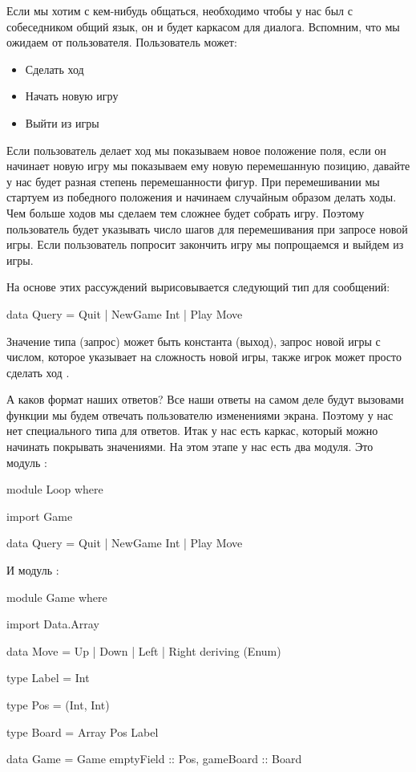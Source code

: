Если мы хотим с кем-нибудь общаться, необходимо чтобы
у нас был с собеседником общий язык, он и будет 
каркасом для диалога. Вспомним, что мы ожидаем
от пользователя. Пользователь может:

\begin{itemize}
\item Сделать ход 
\item Начать новую игру
\item Выйти из игры
\end{itemize}

Если пользователь делает ход мы показываем
новое положение поля, если он начинает новую игру
мы показываем ему новую перемешанную позицию, 
давайте у нас будет разная степень перемешанности фигур.
При перемешивании мы стартуем из победного положения и 
начинаем случайным образом делать ходы. Чем больше ходов
мы сделаем тем сложнее будет собрать игру. Поэтому
пользователь будет указывать число шагов для перемешивания
при запросе новой игры. Если пользователь попросит 
закончить игру мы попрощаемся и выйдем из игры. 

На основе этих рассуждений вырисовывается следующий
тип для сообщений:

\begin{code}
data Query = Quit | NewGame Int | Play Move
\end{code}

Значение типа  (запрос) может быть 
константа  (выход), запрос новой игры 
с числом, которое указывает на сложность новой игры, 
также игрок может просто сделать ход .

А каков формат наших ответов? Все наши ответы на самом деле
будут вызовами функции  мы будем отвечать пользователю
изменениями экрана. Поэтому у нас нет специального типа для ответов.
Итак у нас есть каркас, который можно начинать покрывать
значениями. На этом этапе у нас есть два модуля. Это модуль :

\begin{code}
module Loop where

import Game

data Query = Quit | NewGame Int | Play Move
\end{code}

\noindent И модуль :

\begin{code}
module Game where

import Data.Array

data Move = Up | Down | Left | Right
    deriving (Enum)

type Label = Int

type Pos = (Int, Int)

type Board = Array Pos Label

data Game = Game {
        emptyField  :: Pos,
        gameBoard   :: Board }
\end{code}

